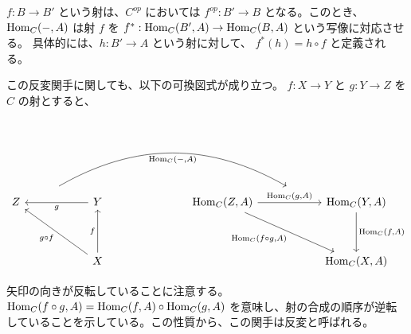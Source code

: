 \documentclass[uplatex,a4j,12pt,dvipdfmx]{jsarticle}
\begin{document}
$f : B \to B'$
という射は、$C^{op}$ においては
$f^{op} : B' \to B$
となる。このとき、${\rm Hom}_{C}(-,A)$ は射 $f$ を
$f^* : {\rm Hom}_{C}(B',A) \to {\rm Hom}_{C}(B,A)$
という写像に対応させる。
具体的には、$h: B' \to A$ という射に対して、
$f^*(h) = h \circ f$
と定義される。

この反変関手に関しても、以下の可換図式が成り立つ。
$f: X \to Y$ と $g: Y \to Z$ を $C$ の射とすると、

\[
	\begin{tikzcd}
		& {} \arrow[rrrrr, "{{\rm Hom}_{C}(-, A)}"', bend left, shift right=8] &                                             &  &  &                                                                                                         & {} &                                                         \\
		Z &                                                                      & Y \arrow[ll, "g"]                           &  &  & {{\rm Hom}_{C}(Z,A)} \arrow[rr, "{{\rm Hom}_{C}(g, A)}"] \arrow[rrdd, "{{\rm Hom}_{C}(f \circ g, A)}"'] &    & {{\rm Hom}_{C}(Y,A)} \arrow[dd, "{{\rm Hom}_{C}(f,A)}"] \\
		&                                                                      &                                             &  &  &                                                                                                         &    &                                                         \\
		&                                                                      & X \arrow[uu, "f"] \arrow[lluu, "g \circ f"] &  &  &                                                                                                         &    & {{\rm Hom}_{C}(X,A)}
	\end{tikzcd}
\]

矢印の向きが反転していることに注意する。
${\rm Hom}_{C}(f \circ g, A) = {\rm Hom}_{C}(f,A) \circ {\rm Hom}_{C}(g,A)$ を意味し、射の合成の順序が逆転していることを示している。この性質から、この関手は反変と呼ばれる。
\end{document}
